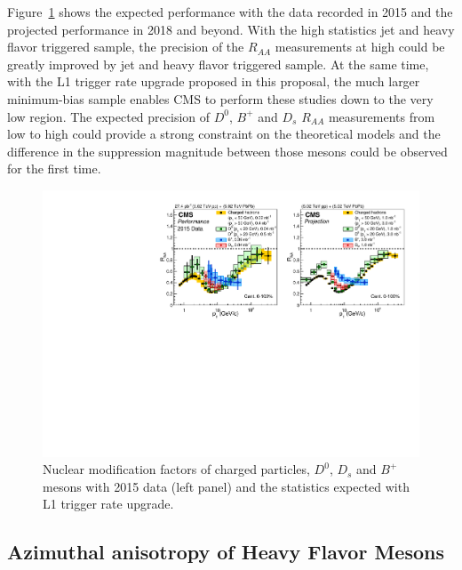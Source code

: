 Figure~\ref{fig:RAA_2015} shows the expected performance with the data recorded in 2015 and the projected performance in 2018 and beyond. With the high statistics jet and heavy flavor triggered sample, the precision of the $R_{AA}$ measurements at high \pt could be greatly improved by jet and heavy flavor triggered sample. At the same time, with the L1 trigger rate upgrade proposed in this proposal, the much larger minimum-bias sample enables CMS to perform these studies down to the very low \pt region. The expected precision of $D^0$, $B^+$ and $D_s$ $R_{AA}$ measurements from low \pt to high \pt could provide a strong constraint on the theoretical models and the difference in the suppression magnitude between those mesons could be observed for the first time.


\begin{figure}[!ht]
\begin{center}
\includegraphics[width=.98\textwidth]{figures/cRAA_lumiTG_3_lumiMB_1_v2.pdf}
\caption{Nuclear modification factors of charged particles, $D^0$, $D_s$ and $B^+$ mesons with 2015 data (left panel) and the statistics expected with L1 trigger rate upgrade.}
\label{fig:RAA_2015}
\end{center}
\end{figure}

\subsection{Azimuthal anisotropy of Heavy Flavor Mesons}

